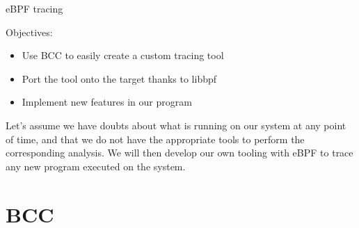 \subchapter
{eBPF tracing}
{Objectives:
  \begin{itemize}
    \item Use BCC to easily create a custom tracing tool
    \item Port the tool onto the target thanks to libbpf
    \item Implement new features in our program
  \end{itemize}
}

Let's assume we have doubts about what is running on our system at any point of
time, and that we do not have the appropriate tools to perform the
corresponding analysis. We will then develop our own tooling with eBPF to trace any new
program executed on the system.

\section{BCC}

